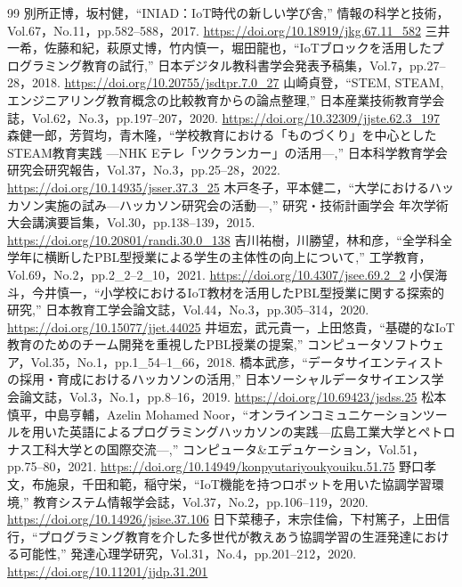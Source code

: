 \documentclass[uplatex,dvipdfmx]{jlreq}
\begin{document}
\clearpage
\begin{thebibliography}{99}
 別所正博，坂村健，``INIAD：IoT時代の新しい学び舎,'' 情報の科学と技術，Vol.67，No.11，pp.582--588，2017. \url{https://doi.org/10.18919/jkg.67.11_582}
 三井一希，佐藤和紀，萩原丈博，竹内慎一，堀田龍也，``IoTブロックを活用したプログラミング教育の試行,'' 日本デジタル教科書学会発表予稿集，Vol.7，pp.27--28，2018. \url{https://doi.org/10.20755/jsdtpr.7.0_27}
 山崎貞登，``STEM, STEAM, エンジニアリング教育概念の比較教育からの論点整理,'' 日本産業技術教育学会誌，Vol.62，No.3，pp.197--207，2020. \url{https://doi.org/10.32309/jjste.62.3_197}
 森健一郎，芳賀均，青木隆，``学校教育における「ものづくり」を中心としたSTEAM教育実践 ---NHK Eテレ「ツクランカー」の活用---,'' 日本科学教育学会研究会研究報告，Vol.37，No.3，pp.25--28，2022. \url{https://doi.org/10.14935/jsser.37.3_25}
 木戸冬子，平本健二，``大学におけるハッカソン実施の試み---ハッカソン研究会の活動---,'' 研究・技術計画学会 年次学術大会講演要旨集，Vol.30，pp.138--139，2015. \url{https://doi.org/10.20801/randi.30.0_138}
 吉川祐樹，川勝望，林和彦，``全学科全学年に横断したPBL型授業による学生の主体性の向上について,'' 工学教育，Vol.69，No.2，pp.2\_2--2\_10，2021. \url{https://doi.org/10.4307/jsee.69.2_2}
 小俣海斗，今井慎一，``小学校におけるIoT教材を活用したPBL型授業に関する探索的研究,'' 日本教育工学会論文誌，Vol.44，No.3，pp.305--314，2020. \url{https://doi.org/10.15077/jjet.44025}
 井垣宏，武元貴一，上田悠貴，``基礎的なIoT教育のためのチーム開発を重視したPBL授業の提案,'' コンピュータソフトウェア，Vol.35，No.1，pp.1\_54--1\_66，2018.
 橋本武彦，``データサイエンティストの採用・育成におけるハッカソンの活用,'' 日本ソーシャルデータサイエンス学会論文誌，Vol.3，No.1，pp.8--16，2019. \url{https://doi.org/10.69423/jsdss.25}
 松本慎平，中島亨輔，Azelin Mohamed Noor，``オンラインコミュニケーションツールを用いた英語によるプログラミングハッカソンの実践---広島工業大学とペトロナス工科大学との国際交流---,'' コンピュータ\&エデュケーション，Vol.51，pp.75--80，2021. \url{https://doi.org/10.14949/konpyutariyoukyouiku.51.75}
 野口孝文，布施泉，千田和範，稲守栄，``IoT機能を持つロボットを用いた協調学習環境,'' 教育システム情報学会誌，Vol.37，No.2，pp.106--119，2020. \url{https://doi.org/10.14926/jsise.37.106}
 日下菜穂子，末宗佳倫，下村篤子，上田信行，``プログラミング教育を介した多世代が教えあう協調学習の生涯発達における可能性,'' 発達心理学研究，Vol.31，No.4，pp.201--212，2020. \url{https://doi.org/10.11201/jjdp.31.201}

\end{thebibliography}
\end{document}
